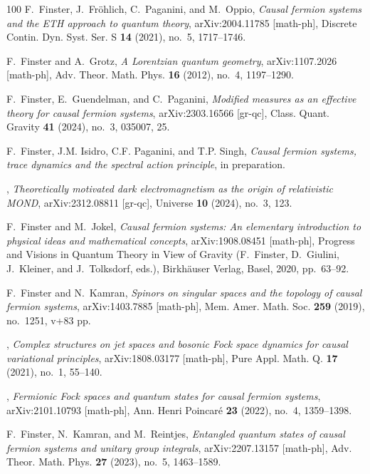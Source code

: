 \documentclass[reqno,11pt]{amsart}
\numberwithin{equation}{section}
\newcommand{\1}{\mbox{\rm 1 \hspace{-1.05 em} 1}}
\begin{document}
{\begin{thebibliography}{100}
F.~Finster, J.~Fr\"ohlich, C.~Paganini, and M.~Oppio, \emph{Causal fermion
  systems and the {ETH} approach to quantum theory}, arXiv:2004.11785
  [math-ph], Discrete Contin. Dyn. Syst. Ser. S \textbf{14} (2021), no.~5,
  1717--1746.

F.~Finster and A.~Grotz, \emph{A {L}orentzian quantum geometry},
  arXiv:1107.2026 [math-ph], Adv. Theor. Math. Phys. \textbf{16} (2012), no.~4,
  1197--1290.

F.~Finster, E.~Guendelman, and C.~Paganini, \emph{Modified measures as an
  effective theory for causal fermion systems}, arXiv:2303.16566 [gr-qc],
  Class. Quant. Gravity \textbf{41} (2024), no.~3, 035007, 25.

F.~Finster, J.M. Isidro, C.F. Paganini, and T.P. Singh, \emph{Causal fermion
  systems, trace dynamics and the spectral action principle}, in preparation.

\bysame, \emph{Theoretically motivated dark electromagnetism as the origin of
  relativistic {MOND}}, arXiv:2312.08811 [gr-qc], Universe \textbf{10} (2024),
  no.~3, 123.

F.~Finster and M.~Jokel, \emph{Causal fermion systems: {A}n elementary
  introduction to physical ideas and mathematical concepts}, arXiv:1908.08451
  [math-ph], {P}rogress and {V}isions in {Q}uantum {T}heory in {V}iew of
  {G}ravity (F.~Finster, D.~Giulini, J.~Kleiner, and J.~Tolksdorf, eds.),
  Birkh\"auser Verlag, Basel, 2020, pp.~63--92.

F.~Finster and N.~Kamran, \emph{Spinors on singular spaces and the topology of
  causal fermion systems}, arXiv:1403.7885 [math-ph], Mem. Amer. Math. Soc.
  \textbf{259} (2019), no.~1251, v+83 pp.

\bysame, \emph{Complex structures on jet spaces and bosonic {F}ock space
  dynamics for causal variational principles}, arXiv:1808.03177 [math-ph], Pure
  Appl. Math. Q. \textbf{17} (2021), no.~1, 55--140.

\bysame, \emph{Fermionic {F}ock spaces and quantum states for causal fermion
  systems}, arXiv:2101.10793 [math-ph], Ann. Henri Poincar\'{e} \textbf{23}
  (2022), no.~4, 1359--1398.

F.~Finster, N.~Kamran, and M.~Reintjes, \emph{Entangled quantum states of
  causal fermion systems and unitary group integrals}, arXiv:2207.13157
  [math-ph], Adv. Theor. Math. Phys. \textbf{27} (2023), no.~5, 1463--1589.


\end{thebibliography}}
\end{document}
